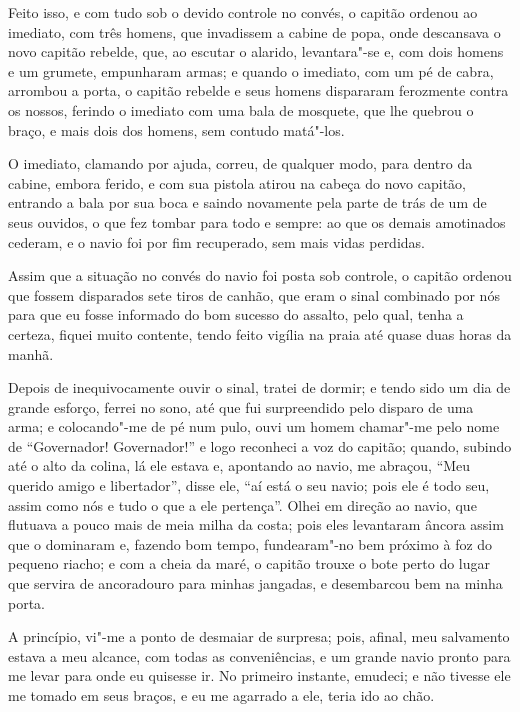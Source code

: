Feito isso, e com tudo sob o devido controle no convés, o capitão
ordenou ao imediato, com três homens, que invadissem a cabine de popa,
onde descansava o novo capitão rebelde, que, ao escutar o alarido,
levantara"-se e, com dois homens e um grumete, empunharam armas; e quando
o imediato, com um pé de cabra, arrombou a porta, o capitão rebelde e
seus homens dispararam ferozmente contra os nossos, ferindo o imediato
com uma bala de mosquete, que lhe quebrou o braço, e mais dois dos
homens, sem contudo matá"-los.

O imediato, clamando por ajuda, correu, de qualquer modo, para dentro da
cabine, embora ferido, e com sua pistola atirou na cabeça do novo
capitão, entrando a bala por sua boca e saindo novamente pela parte de
trás de um de seus ouvidos, o que fez tombar para todo e sempre: ao que
os demais amotinados cederam, e o navio foi por fim recuperado, sem mais
vidas perdidas.

Assim que a situação no convés do navio foi posta sob controle, o
capitão ordenou que fossem disparados sete tiros de canhão, que eram o
sinal combinado por nós para que eu fosse informado do bom sucesso do
assalto, pelo qual, tenha a certeza, fiquei muito contente, tendo feito
vigília na praia até quase duas horas da manhã.

Depois de inequivocamente ouvir o sinal, tratei de dormir; e tendo sido
um dia de grande esforço, ferrei no sono, até que fui surpreendido pelo
disparo de uma arma; e colocando"-me de pé num pulo, ouvi um homem
chamar"-me pelo nome de ``Governador! Governador!'' e logo reconheci a
voz do capitão; quando, subindo até o alto da colina, lá ele estava e,
apontando ao navio, me abraçou, ``Meu querido amigo e libertador'',
disse ele, ``aí está o seu navio; pois ele é todo seu, assim como nós e
tudo o que a ele pertença''. Olhei em direção ao navio, que flutuava a
pouco mais de meia milha da costa; pois eles levantaram âncora assim que
o dominaram e, fazendo bom tempo, fundearam"-no bem próximo à foz do
pequeno riacho; e com a cheia da maré, o capitão trouxe o bote perto do
lugar que servira de ancoradouro para minhas jangadas, e desembarcou bem
na minha porta.

A princípio, vi"-me a ponto de desmaiar de surpresa; pois, afinal, meu
salvamento estava a meu alcance, com todas as conveniências, e um grande
navio pronto para me levar para onde eu quisesse ir. No primeiro
instante, emudeci; e não tivesse ele me tomado em seus braços, e eu me
agarrado a ele, teria ido ao chão.

